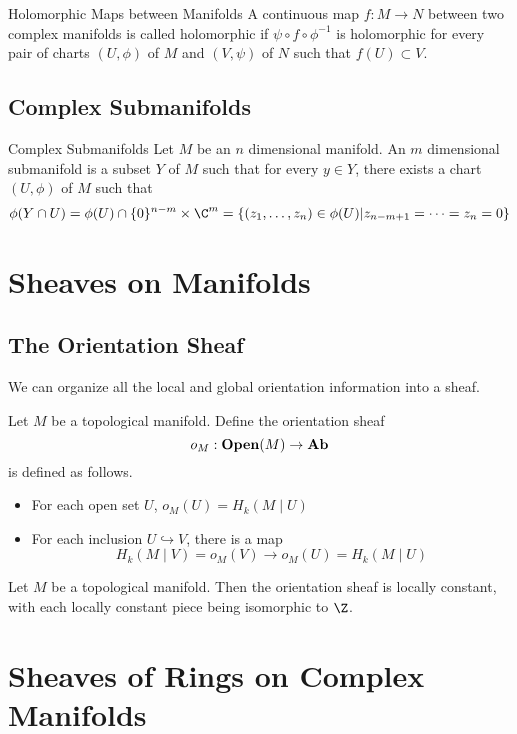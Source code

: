 \documentclass[a4paper]{article}
\begin{document}
\begin{defn}{Holomorphic Maps between Manifolds}{} A continuous map $f:M\to N$ between two complex manifolds is called holomorphic if $\psi\circ f\circ\phi^{-1}$ is holomorphic for every pair of charts $(U,\phi)$ of $M$ and $(V,\psi)$ of $N$ such that $f(U)\subset V$. 
\end{defn}

\subsection{Complex Submanifolds}
\begin{defn}{Complex Submanifolds}{} Let $M$ be an $n$ dimensional manifold. An $m$ dimensional submanifold is a subset $Y$ of $M$ such that for every $y\in Y$, there exists a chart $(U,\phi)$ of $M$ such that $$\phi(Y\cap U)=\phi(U)\cap\{0\}^{n-m}\times\C^m=\{(z_1,\dots,z_n)\in\phi(U)|z_{n-m+1}=\dots=z_n=0\}$$
\end{defn}

\pagebreak
\section{Sheaves on Manifolds}
\subsection{The Orientation Sheaf}
We can organize all the local and global orientation information into a sheaf. 

\begin{defn} Let $M$ be a topological manifold. Define the orientation sheaf $$o_M:\bold{Open}(M)\to\bold{Ab}$$ is defined as follows. 
\begin{itemize}
\item For each open set $U$, $o_M(U)=H_k(M\;|\;U)$
\item For each inclusion $U\hookrightarrow V$, there is a map $$H_k(M\;|\;V)=o_M(V)\to o_M(U)=H_k(M\;|\;U)$$
\end{itemize}
\end{defn}

\begin{lmm}{}{} Let $M$ be a topological manifold. Then the orientation sheaf is locally constant, with each locally constant piece being isomorphic to $\Z$. 
\end{lmm}

\pagebreak
\section{Sheaves of Rings on Complex Manifolds}
\end{document}
